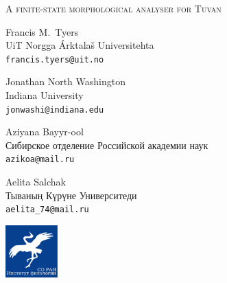\documentclass[fontscale=0.35,landscape,paperwidth=841mm,paperheight=1189mm]{baposter}  %
\begin{document}
\begin{poster}
{	}{ %
		{%
			{\titlefont \scshape{A finite-state morphological analyser for Tuvan}
			}
		}
	}{ %
		\begin{center}
			\begin{minipage}[t]{7em}
				\begin{spacing}{0.4}
				{Francis M.\ Tyers}\\
				{\footnotesize UiT Norgga Árktalaš Universitehta \\\texttt{francis.tyers@uit.no}}
				\end{spacing}
			\end{minipage}
			\begin{minipage}[t]{12em}
				\begin{spacing}{0.4}
					{Jonathan North Washington}\\
					{\footnotesize Indiana University\\\texttt{jonwashi@indiana.edu}}
				\end{spacing}
			\end{minipage}
			\begin{minipage}[t]{8em} %
				\begin{spacing}{0.4}
					{Aziyana Bayyr-ool}\\
					{\footnotesize Сибирское отделение Российской академии наук\\\texttt{azikoa@mail.ru}}
				\end{spacing}
			\end{minipage}
			\begin{minipage}[t]{6em}
				\begin{spacing}{0.4}
					{Aelita Salchak}\\
					{\footnotesize Тываның Күрүне Университеди\\\texttt{aelita\_74@mail.ru}}
				\end{spacing}
			\end{minipage}
		\end{center}
	}{ %
		\setlength\fboxsep{0.5em}
		\setlength\fboxrule{0pt}
		\includegraphics[height=5.4em]{img/soranif}
	}


\end{poster}
\end{document}
